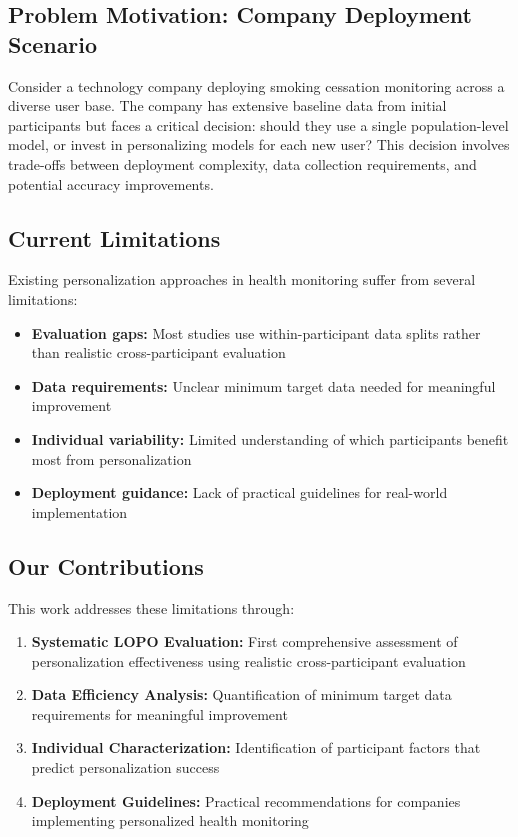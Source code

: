 \documentclass[twocolumn]{article}
\begin{document}
\subsection{Problem Motivation: Company Deployment Scenario}
Consider a technology company deploying smoking cessation monitoring across a diverse user base. The company has extensive baseline data from initial participants but faces a critical decision: should they use a single population-level model, or invest in personalizing models for each new user? This decision involves trade-offs between deployment complexity, data collection requirements, and potential accuracy improvements.

\subsection{Current Limitations}
Existing personalization approaches in health monitoring suffer from several limitations:
\begin{itemize}
    \item \textbf{Evaluation gaps:} Most studies use within-participant data splits rather than realistic cross-participant evaluation
    \item \textbf{Data requirements:} Unclear minimum target data needed for meaningful improvement
    \item \textbf{Individual variability:} Limited understanding of which participants benefit most from personalization
    \item \textbf{Deployment guidance:} Lack of practical guidelines for real-world implementation
\end{itemize}

\subsection{Our Contributions}
This work addresses these limitations through:
\begin{enumerate}
    \item \textbf{Systematic LOPO Evaluation:} First comprehensive assessment of personalization effectiveness using realistic cross-participant evaluation
    \item \textbf{Data Efficiency Analysis:} Quantification of minimum target data requirements for meaningful improvement
    \item \textbf{Individual Characterization:} Identification of participant factors that predict personalization success
    \item \textbf{Deployment Guidelines:} Practical recommendations for companies implementing personalized health monitoring
\end{enumerate}
\end{document}
